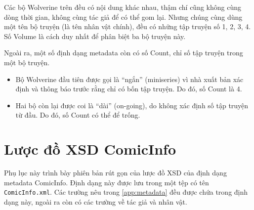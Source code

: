 \documentclass[../../../thesis]{subfiles}
\begin{document}
\begin{appendices}
Các bộ Wolverine trên đều có nội dung khác nhau, thậm chí cũng không cùng dòng
thời gian, không cùng tác giả để có thể gom lại. Nhưng chúng cùng dùng một tên
bộ truyện (là tên nhân vật chính), đều có những tập truyện số 1, 2, 3, 4. Số
Volume là cách duy nhất để phân biệt ba bộ truyện này.

Ngoài ra, một số định dạng metadata còn có số Count, chỉ số tập truyện trong một
bộ truyện.

\begin{itemize}
    \item
        Bộ Wolverine đầu tiên được gọi là ``ngắn'' (miniseries) vì nhà xuất bản
        xác định và thông báo trước rằng chỉ có bốn tập truyện. Do đó, số Count
        là 4.
    \item
        Hai bộ còn lại được coi là ``dài'' (on-going), do không xác định số tập
        truyện từ đầu. Do đó, số Count có thể để trống.
\end{itemize}



\chapter{Lược đồ XSD ComicInfo}\label{app:comic-info-xsd}

Phụ lục này trình bày phiên bản rút gọn của lược đồ XSD của định dạng metadata
ComicInfo. Định dạng này được lưu trong một tệp có tên \texttt{ComicInfo.xml}.
Các trường nêu trong \autoref{app:metadata} đều được chứa trong định dạng này,
ngoài ra còn có các trường về tác giả và nhân vật.



\end{appendices}
\end{document}
